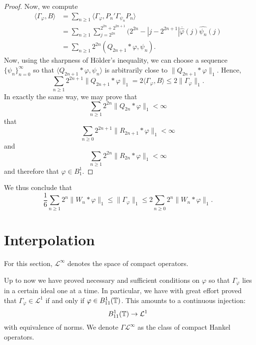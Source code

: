 \begin{proof}
    Now, we compute
    \begin{align}
        \langle \Gamma_\varphi,B \rangle &= \sum_{n\geq 1} \langle \Gamma_\varphi,P_n'\Gamma_{\psi_n}P_n\rangle\\
        &= \sum_{n\geq 1} \sum_{j=2^{2n}}^{2^{2n}+2^{2n+1}}(2^{2n}-|j-2^{2n+1}|\overline{\widehat{\varphi}}(j)\widehat{\psi_n}(j)\\
        &= \sum_{n\geq 1} 2^{2n} (Q_{2n+1}*\varphi,\psi_n).
    \end{align}
    Now, using the sharpness of H\"older's inequality, we can choose
    a sequence $\{\psi_n\}_{n=0}^\infty$ so that $\langle Q_{2n+1}*\varphi,\psi_n\rangle$
    is arbitrarily close to $\|Q_{2n+1}*\varphi\|_1$. Hence,
    \begin{equation}
        \sum_{n\geq 1}2^{2n+1}\|Q_{2n+1}*\varphi\|_1 = 2\langle \Gamma_\varphi,B\rangle \leq 2\|\Gamma_\varphi\|_1.
    \end{equation}
    In exactly the same way, we may prove that
    \begin{equation}
        \sum_{n\geq 1}2^{2n}\|Q_{2n}*\varphi\|_1 < \infty
    \end{equation} 
    that
    \begin{equation}
        \sum_{n\geq 0} 2^{2n+1} \|R_{2n+1}*\varphi\|_1 < \infty
    \end{equation}
    and
    \begin{equation}
        \sum_{n\geq 1} 2^{2n}\|R_{2n}*\varphi\|_1 < \infty
    \end{equation}
    and therefore that $\varphi \in B_1^1$.
\end{proof} 

\begin{remark}
    We thus conclude that
    \begin{equation}
        \frac{1}{6}\sum_{n\geq 1}2^n \|W_n*\varphi\|_1 \leq \|\Gamma_\varphi\|_1 \leq 2\sum_{n\geq 0} 2^n\|W_n*\varphi\|_1.
    \end{equation}
\end{remark}

\section{Interpolation}
For this section, $\mathcal{L}^\infty$ denotes the space of compact operators.

Up to now we have proved necessary and sufficient conditions
on $\varphi$ so that $\Gamma_\varphi$ lies in a certain ideal one at a time.
In particular, we have with great effort proved that $\Gamma_\varphi \in \mathcal{L}^1$
if and only if $\varphi \in B_{11}^1(\mathbb{T})$.
This amounts to a continuous
injection:
\begin{equation}
\label{emb1}
    B_{11}^1(\Circ) \to \mathcal{L}^1
\end{equation}
with equivalence of norms.
We denote $\Gamma\mathcal{L}^\infty$
as the class of compact Hankel operators.

